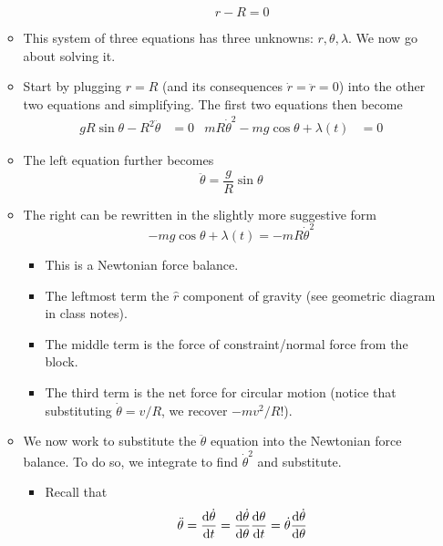 \documentclass[../notes.tex]{subfiles}
\begin{document}
\begin{itemize}
\begin{itemize}
\begin{itemize}
            \begin{equation*}
                r-R = 0
            \end{equation*}
        \end{itemize}
        \item This system of three equations has three unknowns: $r,\theta,\lambda$. We now go about solving it.
        \item Start by plugging $r=R$ (and its consequences $\dot{r}=\ddot{r}=0$) into the other two equations and simplifying. The first two equations then become
        \begin{align*}
            gR\sin\theta-R^2\ddot{\theta} &= 0&
            mR\dot{\theta}^2-mg\cos\theta+\lambda(t) &= 0
        \end{align*}
        \item The left equation further becomes
        \begin{equation*}
            \ddot{\theta} = \frac{g}{R}\sin\theta
        \end{equation*}
        \item The right can be rewritten in the slightly more suggestive form
        \begin{equation*}
            -mg\cos\theta+\lambda(t) = -mR\dot{\theta}^2
        \end{equation*}
        \begin{itemize}
            \item This is a Newtonian force balance.
            \item The leftmost term the $\hat{r}$ component of gravity (see geometric diagram in class notes).
            \item The middle term is the force of constraint/normal force from the block.
            \item The third term is the net force for circular motion (notice that substituting $\dot{\theta}=v/R$, we recover $-mv^2/R$!).
        \end{itemize}
        \item We now work to substitute the $\ddot{\theta}$ equation into the Newtonian force balance. To do so, we integrate to find $\dot{\theta}^2$ and substitute.
        \begin{itemize}
            \item Recall that
            \begin{equation*}
                \ddot{\theta} = \dv{\dot{\theta}}{t}
                = \dv{\dot{\theta}}{\theta}\dv{\theta}{t}
                = \dot{\theta}\dv{\dot{\theta}}{\theta}

\end{equation*}
\end{itemize}
\end{itemize}
\end{itemize}
\end{document}
